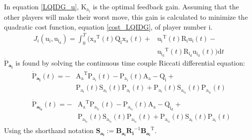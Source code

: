 \documentclass[conference]{IEEEtran}
\begin{document}
In equation \eqref{LQIDG_u}, $\boldsymbol{\mathrm{K_{a_i}}}$ is the optimal feedback gain. Assuming that the other players will make their worst move, this gain is calculated to minimize the quadratic cost function, equation \eqref{cost_LQIDG}, of player number i.
\begin{equation}\label{cost_LQIDG}
    \begin{split}
        J_i( \boldsymbol{\mathrm{u_i}},  \boldsymbol{\mathrm{u_{i_d}}}) = \int_{0}^{T}\biggl (\boldsymbol{\mathrm{x_a}} ^\mathrm{T}(t) \boldsymbol{\mathrm{Q_i}} \boldsymbol{\mathrm{x_a}}(t)+
        &\boldsymbol{\mathrm{u_i}} ^\mathrm{T}(t) \boldsymbol{\mathrm{R_{i}}} \boldsymbol{\mathrm{u_i}}(t)-\\
        &\boldsymbol{\mathrm{u_{i_d}}} ^\mathrm{T}(t)\boldsymbol{\mathrm{ R_{i_d} u_{i_d}}}(t)
        \biggl )\mathrm{d}t
    \end{split} 
\end{equation}
$\boldsymbol{\dot{\mathrm{P}}_{a_i}}$ is found by solving the continuous time couple Riccati differential equation:
\begin{equation}\label{coupled_riccatti_LQIDG}
    \begin{split}
        &\begin{split}
            \boldsymbol{\dot{\mathrm{P}}_{a_i}}(t) = -&\boldsymbol{\mathrm{A_a}}^\mathrm{T}\boldsymbol{\mathrm{P_{a_i}}}(t) - \boldsymbol{\mathrm{P_{a_i}}}(t)\boldsymbol{\mathrm{A_a}} - \boldsymbol{\mathrm{Q_i}} +\\ &\boldsymbol{\mathrm{P_{a_i}}}(t)\boldsymbol{\mathrm{S_{a_i}}}(t)\boldsymbol{\mathrm{P_{a_i}}}(t) + \boldsymbol{\mathrm{P_{a_i}}}(t)\boldsymbol{\mathrm{S_{a_{i_d}}}}(t)\boldsymbol{\mathrm{P_{a_{i_d}}}}(t)
        \end{split}\\
        &\begin{split}
            \boldsymbol{\dot{\mathrm{P}}_{a_{i_d}}}(t) = -&\boldsymbol{\mathrm{A_a}}^\mathrm{T}\boldsymbol{\mathrm{P_{a_{i_d}}}}(t) - \boldsymbol{\mathrm{P_{a_{i_d}}}}(t)\boldsymbol{\mathrm{A_a}} - \boldsymbol{\mathrm{Q_{i_d}}} +\\ &\boldsymbol{\mathrm{P_{a_{i_d}}}}(t)\boldsymbol{\mathrm{S_{a_{i_d}}}}(t)\boldsymbol{\mathrm{P_{a_{i_d}}}}(t) + \boldsymbol{\mathrm{P_{a_{i_d}}}}(t)\boldsymbol{\mathrm{S_{a_i}}}(t)\boldsymbol{\mathrm{P_{a_i}}}(t)
        \end{split}
    \end{split}
\end{equation}
Using the shorthand notation $\boldsymbol{S_{a_i}} := \boldsymbol{B_{a_i}R_{i}}^{-1}\boldsymbol{B_{a_i}}^\mathrm{T}$. 
\end{document}
